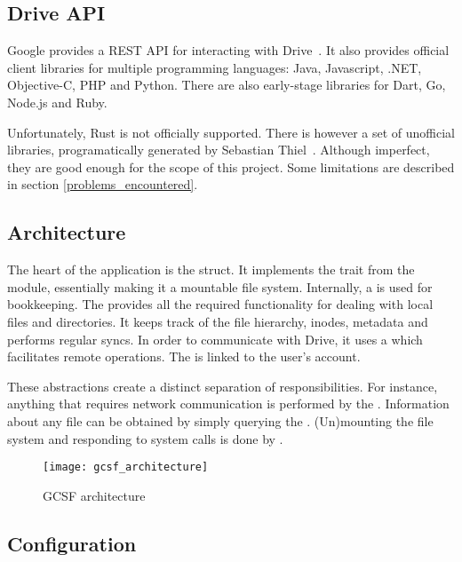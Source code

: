 \subsection{Drive API}

Google provides a REST API for interacting with Drive~\cite{google_drive_rest_api_overview}. It also provides official client libraries for multiple programming languages: Java, Javascript, .NET, Objective-C, PHP and Python. There are also early-stage libraries for Dart, Go, Node.js and Ruby.

Unfortunately, Rust is not officially supported. There is however a set of unofficial libraries, programatically generated by Sebastian Thiel~\cite{google_apis_rs,sebastian_thiel}. Although imperfect, they are good enough for the scope of this project. Some limitations are described in section \ref{problems_encountered}.

\subsection{Architecture}

The heart of the application is the  struct. It implements the  trait from the  module, essentially making it a mountable file system. Internally, a  is used for bookkeeping. The  provides all the required functionality for dealing with local files and directories. It keeps track of the file hierarchy, inodes, metadata and performs regular syncs. In order to communicate with Drive, it uses a  which facilitates remote operations. The  is linked to the user's account.

These abstractions create a distinct separation of responsibilities. For instance, anything that requires network communication is performed by the . Information about any file can be obtained by simply querying the . (Un)mounting the file system and responding to system calls is done by .

\begin{figure}[bpt]
\caption{GCSF architecture}
\label{fig:gcsf_architecture}
\centering
\texttt{[image: gcsf\_architecture]}
\end{figure}

\subsection{Configuration}

